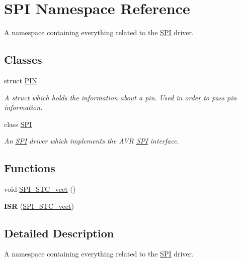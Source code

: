 \hypertarget{namespace_s_p_i}{}\section{S\+PI Namespace Reference}
\label{namespace_s_p_i}


A namespace containing everything related to the \hyperlink{namespace_s_p_i}{S\+PI} driver.  


\subsection*{Classes}
\begin{DoxyCompactItemize}
\item 
struct \hyperlink{struct_s_p_i_1_1_p_i_n}{P\+IN}
\begin{DoxyCompactList}\small\item\em A struct which holds the information about a pin. Used in order to pass pin information. \end{DoxyCompactList}\item 
class \hyperlink{class_s_p_i_1_1_s_p_i}{S\+PI}
\begin{DoxyCompactList}\small\item\em An \hyperlink{class_s_p_i_1_1_s_p_i}{S\+PI} driver which implements the A\+VR \hyperlink{class_s_p_i_1_1_s_p_i}{S\+PI} interface. \end{DoxyCompactList}\end{DoxyCompactItemize}
\subsection*{Functions}
\begin{DoxyCompactItemize}
\item 
void \hyperlink{namespace_s_p_i_ae2f79145ecdd9d5f82d31283a4fcf80f}{S\+P\+I\+\_\+\+S\+T\+C\+\_\+vect} ()
\item 
\hypertarget{namespace_s_p_i_ae32beb206df835f990073ee240bf6b73}{}\label{namespace_s_p_i_ae32beb206df835f990073ee240bf6b73} 
{\bfseries I\+SR} (\hyperlink{namespace_s_p_i_ae2f79145ecdd9d5f82d31283a4fcf80f}{S\+P\+I\+\_\+\+S\+T\+C\+\_\+vect})
\end{DoxyCompactItemize}


\subsection{Detailed Description}
A namespace containing everything related to the \hyperlink{namespace_s_p_i}{S\+PI} driver. 

